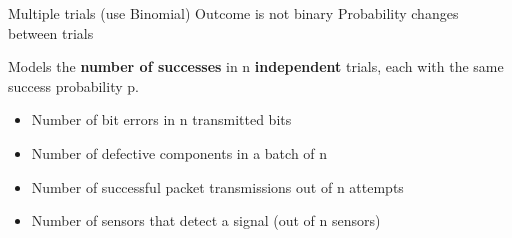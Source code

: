 
\PSno{} Multiple trials (use Binomial)\PSbr{}\PSno{} Outcome is not binary\PSbr{}\PSno{} Probability changes between trials



\begin{Shaded}
\begin{Highlighting}[]
 \OperatorTok{=} \OperatorTok{;}          
 \OperatorTok{=} \OperatorTok{;}
 \OperatorTok{=} \NormalTok{(}\OperatorTok{,} \OperatorTok{,} \OperatorTok{,} \NormalTok{)}\OperatorTok{;}  

\NormalTok{(}\OperatorTok{,} \NormalTok{(}\NormalTok{)}\OperatorTok{,} \NormalTok{)}\OperatorTok{;}
\NormalTok{(}\OperatorTok{,} \NormalTok{(}\NormalTok{)}\OperatorTok{,} \OperatorTok{*}\NormalTok{(}\OperatorTok{{-}}\NormalTok{))}\OperatorTok{;}
\end{Highlighting}
\end{Shaded}



Models the \textbf{number of successes} in n \textbf{independent} trials, each with the same success probability p.


\begin{itemize}
\tightlist
\item
  Number of bit errors in n transmitted bits
\item
  Number of defective components in a batch of n
\item
  Number of successful packet transmissions out of n attempts
\item
  Number of sensors that detect a signal (out of n sensors)
\end{itemize}

